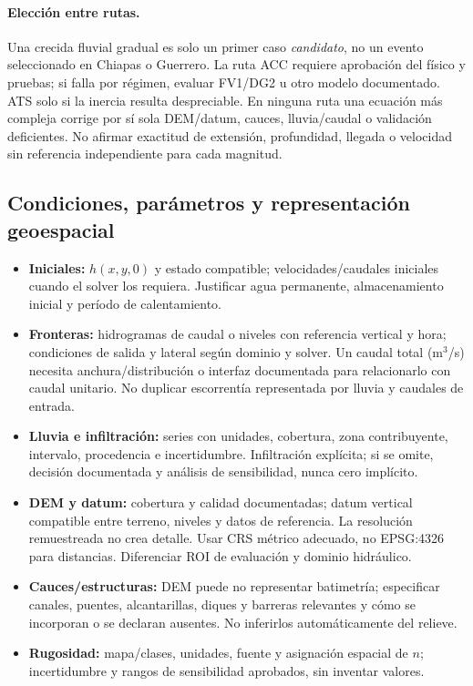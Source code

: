 \documentclass[11pt,a4paper]{article}
\begin{document}
\paragraph{Elección entre rutas.} Una crecida fluvial gradual es solo un primer caso \emph{candidato}, no un evento seleccionado en Chiapas o Guerrero. La ruta ACC requiere aprobación del físico y pruebas; si falla por régimen, evaluar FV1/DG2 u otro modelo documentado. ATS solo si la inercia resulta despreciable. En ninguna ruta una ecuación más compleja corrige por sí sola DEM/datum, cauces, lluvia/caudal o validación deficientes. No afirmar exactitud de extensión, profundidad, llegada o velocidad sin referencia independiente para cada magnitud.

\subsection{Condiciones, parámetros y representación geoespacial}
\begin{itemize}
\item \textbf{Iniciales:} $h(x,y,0)$ y estado compatible; velocidades/caudales iniciales cuando el solver los requiera. Justificar agua permanente, almacenamiento inicial y período de calentamiento.
\item \textbf{Fronteras:} hidrogramas de caudal o niveles con referencia vertical y hora; condiciones de salida y lateral según dominio y solver. Un caudal total (m$^3$/s) necesita anchura/distribución o interfaz documentada para relacionarlo con caudal unitario. No duplicar escorrentía representada por lluvia y caudales de entrada.
\item \textbf{Lluvia e infiltración:} series con unidades, cobertura, zona contribuyente, intervalo, procedencia e incertidumbre. Infiltración explícita; si se omite, decisión documentada y análisis de sensibilidad, nunca cero implícito.
\item \textbf{DEM y datum:} cobertura y calidad documentadas; datum vertical compatible entre terreno, niveles y datos de referencia. La resolución remuestreada no crea detalle. Usar CRS métrico adecuado, no EPSG:4326 para distancias. Diferenciar ROI de evaluación y dominio hidráulico.
\item \textbf{Cauces/estructuras:} DEM puede no representar batimetría; especificar canales, puentes, alcantarillas, diques y barreras relevantes y cómo se incorporan o se declaran ausentes. No inferirlos automáticamente del relieve.
\item \textbf{Rugosidad:} mapa/clases, unidades, fuente y asignación espacial de $n$; incertidumbre y rangos de sensibilidad aprobados, sin inventar valores.
\end{itemize}
\end{document}
